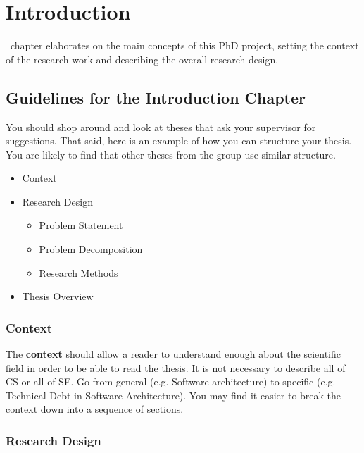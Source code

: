 \chapter{Introduction}
\label{c1}

~chapter elaborates on the main concepts of this PhD project,
setting the context of the research work 
and describing the overall research design.

%
%
%

\section{Guidelines for the Introduction Chapter}
\label{sec:c1:guidelines}

You should shop around and look at theses that ask your supervisor for suggestions.
That said, here is an example of how you can structure your thesis.
You are likely to find that other theses from the group use similar structure.

\begin{itemize}
    \item Context
    \item Research Design
    \begin{itemize}
        \item Problem Statement
        \item Problem Decomposition
        \item Research Methods
    \end{itemize}
    \item Thesis Overview
\end{itemize}

\subsection{Context}
\label{sec:c1:context}

The \textbf{context} should allow a reader to understand enough
about the scientific field in order to be able to read the thesis.
It is not necessary to describe all of CS or all of SE. Go from general
(e.g. Software architecture) to specific (e.g. Technical Debt
in Software Architecture). You may find it easier to break the context down
into a sequence of sections.

\subsection{Research Design}
\label{sec:c1:rd}

